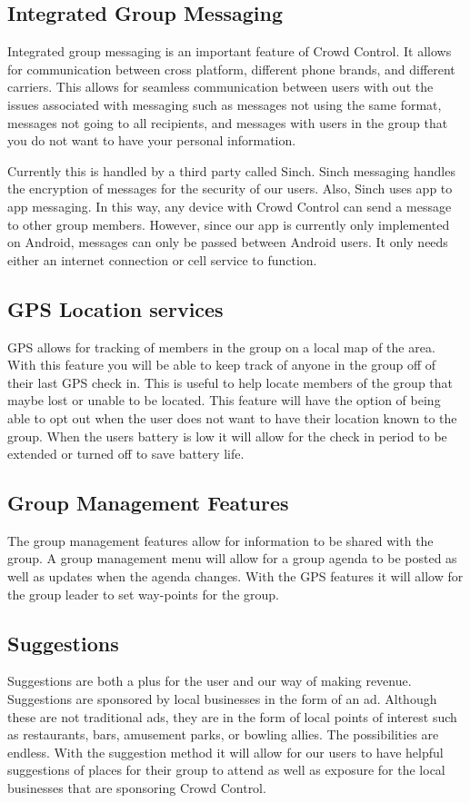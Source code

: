 \subsection{Integrated Group Messaging}
Integrated group messaging is an important feature of Crowd Control. It allows for communication between cross platform, different phone brands, and different carriers. This allows for seamless communication between users with out the issues associated with messaging such as messages not using the same format, messages not going to all recipients, and messages with users in the group that you do not want to have your personal information.

Currently this is handled by a third party called Sinch. Sinch messaging handles the encryption of messages for the security of our users. Also, Sinch uses app to app messaging. In this way, any device with Crowd Control can send a message to other group members. However, since our app is currently only implemented on Android, messages can only be passed between Android users. It only needs either an internet connection or cell service to function.

\subsection{GPS Location services}
GPS allows for tracking of members in the group on a local map of the area. With this feature you will be able to keep track of anyone in the group off of their last GPS check in. This is useful to help locate members of the group that maybe lost or unable to be located. This feature will have the option of being able to opt out when the user does not want to have their location known to the group. When the users battery is low it will allow for the check in period to be extended or turned off to save battery life.


\subsection{Group Management Features}
The group management features allow for information to be shared with the group. A group management menu will allow for a group agenda to be posted as well as updates when the agenda changes. With the GPS features it will allow for the group leader to set way-points for the group.  

\subsection{Suggestions}
Suggestions are both a plus for the user and our way of making revenue. Suggestions are sponsored by local businesses in the form of an ad. Although these are not traditional ads, they are in the form of local points of interest such as restaurants, bars, amusement parks, or bowling allies. The possibilities are endless. With the suggestion method it will allow for our users to have helpful suggestions of places for their group to attend as well as exposure for the local businesses that are sponsoring Crowd Control.


